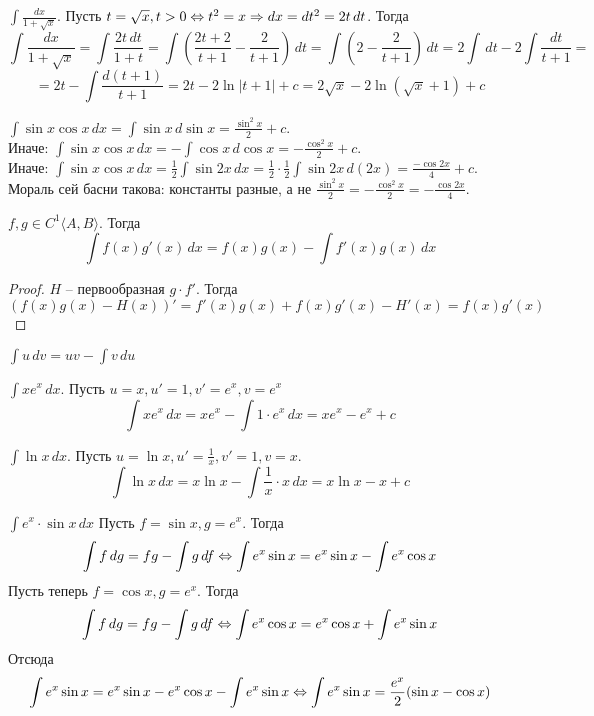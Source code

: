 \begin{Example}
	$\int \frac{dx}{1 + \sqrt{x}}$. Пусть $t = \sqrt{x}, t > 0 \Leftrightarrow t^2 = x \Rightarrow dx = dt^2 = 2t \,dt$. Тогда
	\[\int \frac{dx}{1 + \sqrt{x}} = \int \frac{2t \,dt}{1 + t} = \int \left( \frac{2t + 2}{t + 1} - \frac{2}{t + 1}\right) \,dt = \int \left(2 - \frac{2}{t + 1}\right) \,dt = 2\int \,dt - 2\int \frac{dt}{t + 1} =\] 
	\[= 2t - \int \frac{d(t + 1)}{t + 1} = 2t - 2\ln |t + 1| + c = 2\sqrt{x} - 2\ln (\sqrt{x} + 1) + c\]
\end{Example}

\begin{Example}
	$\int \sin x \cos x \,dx = \int \sin x \,d\sin x = \frac{\sin^2 x }{2} + c$. \\
	Иначе: $\int \sin x \cos x \,dx = -\int \cos x \,d\cos x = - \frac{\cos^2 x}{2} + c$. \\
	Иначе: $\int \sin x \cos x \,dx = \frac{1}{2} \int \sin 2x \,dx = \frac{1}{2} \cdot \frac{1}{2} \int \sin 2x \,d(2x) = \frac{-\cos 2x}{4} + c$. \\
	Мораль сей басни такова: константы разные, а не $ \frac{\sin^2 x}{2} = - \frac{\cos^2 x}{2} = - \frac{\cos 2x}{4}$. 
\end{Example}

\begin{Thm}
	$f, g \in C^1 \langle A, B\rangle$. Тогда 
	\[\int f(x)g'(x) \,dx = f(x) g(x) - \int f'(x) g(x) \,dx\] 
\end{Thm}

\begin{proof}
	$H$ -- первообразная $g \cdot f'$. Тогда 
	\[(f(x) g(x) - H(x))' = f'(x) g(x) + f(x)g'(x) - H'(x) = f(x)g'(x)\]
\end{proof}

\begin{Rem}
	$\int u \,dv = uv - \int v \,du$
\end{Rem}

\begin{Example}
	$\int x e^x \,dx$. Пусть $u = x, u' = 1, v' = e^x, v = e^x$
	\[\int x e^x \,dx = xe^x - \int 1 \cdot e^x \,dx = x e^x - e^x + c\] 
\end{Example}

\begin{Example}
	$\int \ln x \,dx$. Пусть $u = \ln x, u' = \frac{1}{x}, v' = 1, v = x$.
	\[\int \ln x \,dx = x \ln x - \int \frac{1}{x} \cdot x \,dx = x \ln x - x + c\]  
\end{Example}

\begin{Ex}
	$\int e^x \cdot \sin x \,dx$
	Пусть $f = \sin x, g = e^x$. Тогда
	\[\int f \, dg = fg - \int g \, df \Leftrightarrow \int e^x \sin x = e^x\sin x - \int e^x \cos x\]
	Пусть теперь $f = \cos x, g = e^x$. Тогда
	\[\int f \, dg = fg - \int g \, df \Leftrightarrow \int e^x \cos x = e^x \cos x + \int e^x \sin x\]
	Отсюда 
	\[\int e^x \sin x = e^x\sin x - e^x\cos x - \int e^x \sin x \Leftrightarrow \int e^x\sin x = \frac{e^x}{2}(\sin x - \cos x)\]
\end{Ex}

